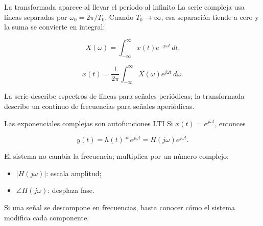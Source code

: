 \documentclass[
  ignorenonframetext,
  aspectratio=169,
  spanish,
  professionalfonts]{beamer}
\providecommand{\tightlist}{%
  \setlength{\itemsep}{0pt}\setlength{\parskip}{0pt}}
\begin{document}
\begin{frame}{La transformada aparece al llevar el período al infinito}
\protect{}\label{la-transformada-aparece-al-llevar-el-peruxedodo-al-infinito}
La serie compleja usa líneas separadas por \(\omega_0=2\pi/T_0\). Cuando
\(T_0\to\infty\), esa separación tiende a cero y la suma se convierte en
integral:

\[
X(\omega)=\int_{-\infty}^{\infty}x(t)e^{-j\omega t}\,dt.
\]

\[
x(t)=\frac{1}{2\pi}\int_{-\infty}^{\infty}X(\omega)e^{j\omega t}\,d\omega.
\]

\begin{tcolorbox}[enhanced jigsaw, arc=.35mm, bottomrule=.15mm, bottomtitle=1mm, breakable, colback=white, colbacktitle=quarto-callout-important-color!10!white, colframe=quarto-callout-important-color-frame, coltitle=black, left=2mm, leftrule=.75mm, opacityback=0, opacitybacktitle=0.6, rightrule=.15mm, title={Continuidad con la semana 5}, titlerule=0mm, toprule=.15mm, toptitle=1mm]

La serie describe espectros de líneas para señales periódicas; la
transformada describe un continuo de frecuencias para señales
aperiódicas.

\end{tcolorbox}
\end{frame}

\begin{frame}{Las exponenciales complejas son autofunciones LTI}
\protect{}\label{las-exponenciales-complejas-son-autofunciones-lti}
Si \(x(t)=e^{j\omega t}\), entonces

\[
y(t)=h(t)*e^{j\omega t}
=H(j\omega)e^{j\omega t}.
\]

El sistema no cambia la frecuencia; multiplica por un número complejo:

\begin{itemize}
\tightlist
\item
  \(|H(j\omega)|\): escala amplitud;
\item
  \(\angle H(j\omega)\): desplaza fase.
\end{itemize}

\begin{tcolorbox}[enhanced jigsaw, arc=.35mm, bottomrule=.15mm, bottomtitle=1mm, breakable, colback=white, colbacktitle=quarto-callout-note-color!10!white, colframe=quarto-callout-note-color-frame, coltitle=black, left=2mm, leftrule=.75mm, opacityback=0, opacitybacktitle=0.6, rightrule=.15mm, title={Por qué importa}, titlerule=0mm, toprule=.15mm, toptitle=1mm]

Si una señal se descompone en frecuencias, basta conocer cómo el sistema
modifica cada componente.

\end{tcolorbox}
\end{frame}
\end{document}
